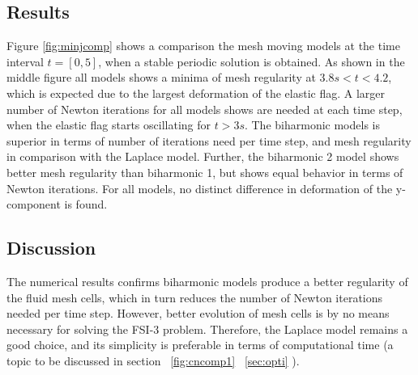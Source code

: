 \subsection*{Results}
Figure \ref{fig:minjcomp} shows a comparison the mesh moving models at the time interval  $t = [0, 5]$, when a stable periodic solution is obtained. As shown in the middle figure all models shows a minima of mesh regularity at $3.8s < t < 4.2$, which is expected due to the largest deformation of the elastic flag. A larger number of Newton iterations for all models shows are needed at each time step, when the elastic flag starts oscillating for $t > 3s$. The biharmonic models is superior in terms of number of iterations need per time step, and mesh regularity in comparison with the Laplace model. Further, the biharmonic 2 model shows better mesh regularity than biharmonic 1, but shows equal behavior in terms of Newton iterations. For all models, no distinct difference in deformation of the y-component is found.
\subsection*{Discussion}
The numerical results confirms biharmonic models produce a better regularity of the fluid mesh cells, which in turn reduces the number of Newton iterations needed per time step. However,  better evolution of mesh cells is by no means necessary for solving the FSI-3 problem. Therefore, the Laplace model remains a good choice, and its simplicity is preferable in terms of computational time (a topic to be discussed in section ~\ref{fig:cncomp1} 
~\ref{sec:opti} ).
\newpage
